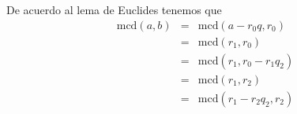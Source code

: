 \documentclass{article} %
\begin{document}
De acuerdo al lema de Euclides tenemos que
\begin{eqnarray*} %
	\mbox{mcd}(a,b) & = & \mbox{mcd}(a-r_0q,r_0) \\[0.2cm]
	& = & \mbox{mcd}(r_1,r_0) \\[0.2cm]
	& = & \mbox{mcd}(r_1,r_0-r_1q_2)\\[0.2cm]
	& = & \mbox{mcd}(r_1,r_2) \\[0.2cm]
	& = & \mbox{mcd}(r_1-r_2q_2,r_2)\\[0.2cm]
\end{eqnarray*}
\end{document}
